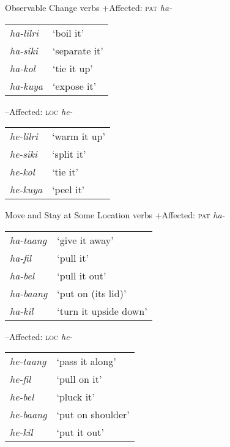 \documentclass[output=paper]{LSP/langsci}
\begin{document}
\ea \label{03-kl-ex:29}
Observable Change verbs \citep[222]{Kratochviletal2015Degrees}
\ea \label{03-kl-ex:29b}
+Affected: \textsc{pat} \textit{ha-}\\
\begin{tabularx}{\textwidth}{ll}
\textit{ha-lilri} & ‘boil it’\\
\textit{ha-siki} & ‘separate it’\\
\textit{ha-kol} & ‘tie it up’\\
\textit{ha-kuya} & ‘expose it’\\
\end{tabularx}

\ex \label{03-kl-ex:29a}
--Affected: \textsc{loc} \textit{he-}\\
\begin{tabularx}{\textwidth}{ll }
\textit{he-lilri} & ‘warm it up’\\
\textit{he-siki} & ‘split it’\\
\textit{he-kol} & ‘tie it’\\
\textit{he-kuya} & ‘peel it’\\
\end{tabularx}
\z
\z

\ea
\label{03-kl-ex:30}
Move and Stay at Some Location verbs \citep[227]{Kratochviletal2015Degrees}
\ea \label{03-kl-ex:30b}
+Affected: \textsc{pat} \textit{ha-}\\
\begin{tabularx}{\textwidth}{ll}
\textit{ha-taang} & ‘give it away’\\
\textit{ha-fil} & ‘pull it’\\
\textit{ha-bel} & ‘pull it out’\\
\textit{ha-baang} & ‘put on (its lid)’\\
\textit{ha-kil} & ‘turn it upside down’\\
\end{tabularx}

\ex \label{03-kl-ex:30a}
--Affected: \textsc{loc} \textit{he-}\\
\begin{tabularx}{\textwidth}{ll}
\textit{he-taang} & ‘pass it along’\\
\textit{he-fil} & ‘pull on it’\\
\textit{he-bel} & ‘pluck it’\\
\textit{he-baang} & ‘put on shoulder’\\
\textit{he-kil} & ‘put it out’\\
\end{tabularx}
\z
\z
\end{document}
